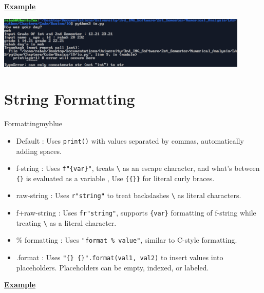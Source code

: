 \newpage
\textbf{\underline{Example}}\\[0.1cm]



\vspace{0.25cm}
\begin{center}
    \includegraphics[width = 0.9\textwidth]{Chapters/ScreenShot/Basics/IO/ioOutput.png}
\end{center}

\vspace{1cm}
\section{String Formatting}

\begin{prettyBox}{Formatting}{myblue}
\begin{itemize}
    \item Default : Uses \texttt{print()} with values separated by commas, automatically adding spaces.
    \item f-string : Uses \texttt{f"\{var\}"}, treats \texttt{\textbackslash} as an escape character, and what's between \texttt{\{\}} is evaluated as a variable , Use \texttt{\{\{\}\}} for literal curly braces.
    \item raw-string : Uses \texttt{r"string"} to treat backslashes \texttt{\textbackslash} as literal characters.
    \item f+raw-string : Uses \texttt{fr"string"}, supports \texttt{\{var\}} formatting of f-string while treating \texttt{\textbackslash} as a literal character.
\item \% formatting : Uses \texttt{"format \% value"}, similar to C-style formatting.
    \item .format : Uses \texttt{"\{\} \{\}".format(val1, val2)} to insert values into placeholders. Placeholders can be empty, indexed, or labeled.
\end{itemize}
\end{prettyBox}

\vspace{0.5cm}

\newpage
\textbf{\underline{Example}}\\[0.1cm]



